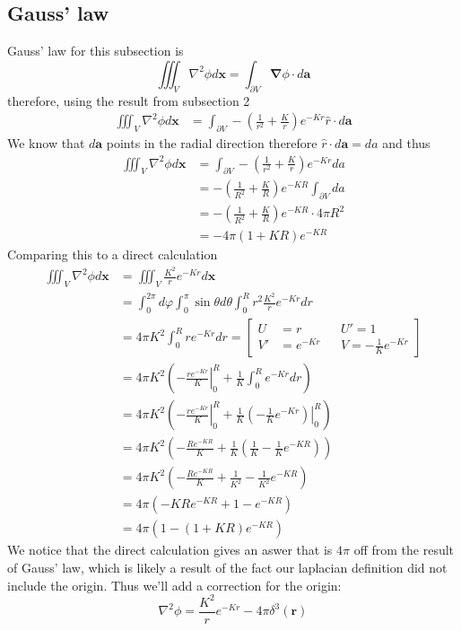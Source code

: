 \subsection{Gauss' law}
Gauss' law for this subsection is
\begin{equation*}
    \iiint_V\nabla^2\phi d\boldsymbol{x} = \int_{\partial V}\boldsymbol{\nabla}\phi \cdot d\boldsymbol{a}
\end{equation*}
therefore, using the result from subsection 2
\begin{align*}
    \iiint_V\nabla^2\phi d\boldsymbol{x} &= \int_{\partial V}-\left(\frac{1}{r^2}+\frac{K}{r}\right)e^{-Kr}\hat{r} \cdot d\boldsymbol{a}
\end{align*}
We know that \(d\boldsymbol{a}\) points in the radial direction therefore \(\hat{r}\cdot d\boldsymbol{a} = da\) and thus
\begin{align*}
    \iiint_V\nabla^2\phi d\boldsymbol{x} &= \int_{\partial V}-\left(\frac{1}{r^2}+\frac{K}{r}\right)e^{-Kr} da\\
    &= -\left(\frac{1}{R^2}+\frac{K}{R}\right)e^{-KR} \int_{\partial V}da\\
    &= -\left(\frac{1}{R^2}+\frac{K}{R}\right)e^{-KR} \cdot 4\pi R^2\\
    &= -4\pi \left(1+KR\right)e^{-KR}
\end{align*}
Comparing this to a direct calculation
\begin{align*}
    \iiint_V\nabla^2\phi d\boldsymbol{x} &= \iiint_V\frac{K^2}{r}e^{-Kr} d\boldsymbol{x}\\
    &= \int_0^{2\pi}d\varphi\int_0^{\pi}\sin\theta d\theta\int_0^{R}r^2\frac{K^2}{r}e^{-Kr}dr\\
    &= 4\pi K^2\int_0^R re^{-Kr}dr = \left[\begin{aligned}
        U&=r && U'=1\\
        V'&=e^{-Kr} && V=-\frac{1}{K}e^{-Kr}
    \end{aligned}\right]\\
    &= 4\pi K^2\left(\left.-\frac{re^{-Kr}}{K}\right|_0^R+\frac{1}{K}\int_0^R e^{-Kr}dr\right)\\
    &= 4\pi K^2\left(\left.-\frac{re^{-Kr}}{K}\right|_0^R+\frac{1}{K}\left.\left(-\frac{1}{K}e^{-Kr}\right)\right|_0^R\right)\\
    &= 4\pi K^2 \left(-\frac{Re^{-KR}}{K} + \frac{1}{K}\left(\frac{1}{K}-\frac{1}{K}e^{-KR}\right)\right)\\
    &= 4\pi K^2 \left(-\frac{Re^{-KR}}{K} + \frac{1}{K^2}-\frac{1}{K^2}e^{-KR}\right)\\
    &= 4\pi \left(-KRe^{-KR}+1-e^{-KR}\right)\\
    &= 4\pi \left(1-(1+KR)e^{-KR}\right)
\end{align*}
We notice that the direct calculation gives an aswer that is \(4\pi\) off from the result of Gauss' law, which is likely a result of the fact our laplacian definition did not include the origin. Thus we'll add a correction for the origin:
\begin{equation*}
    \nabla^2\phi = \frac{K^2}{r}e^{-Kr}-4\pi\delta^3(\boldsymbol{r})
\end{equation*}
\newpage
